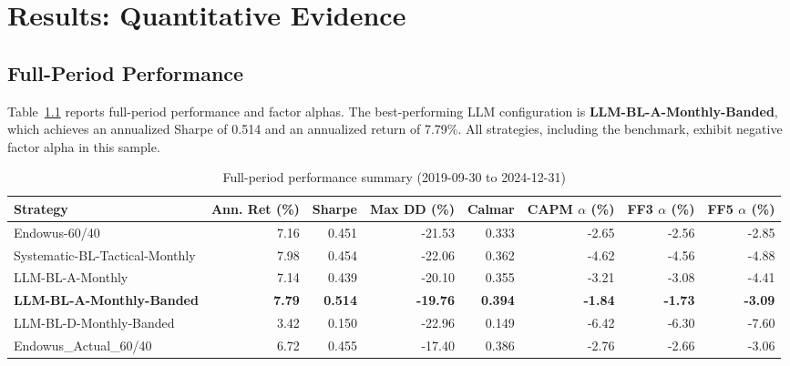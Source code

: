\documentclass[12pt]{report}
\begin{document}
\chapter{Results: Quantitative Evidence}
\section{Full-Period Performance}
Table~\ref{tab:full-period} reports full-period performance and factor alphas.
The best-performing LLM configuration is \textbf{LLM-BL-A-Monthly-Banded}, which achieves an annualized Sharpe of 0.514 and an annualized return of 7.79\%.
All strategies, including the benchmark, exhibit negative factor alpha in this sample.

\begin{table}[H]
    \centering
    \caption{Full-period performance summary (2019-09-30 to 2024-12-31)}
    \label{tab:full-period}
    \small
    \begin{tabular}{lrrrrrrr}
        \toprule
        Strategy                         & Ann. Ret (\%) & Sharpe         & Max DD (\%)     & Calmar         & CAPM $\alpha$ (\%) & FF3 $\alpha$ (\%) & FF5 $\alpha$ (\%) \\
        \midrule
        Endowus-60/40                    & 7.16          & 0.451          & -21.53          & 0.333          & -2.65              & -2.56             & -2.85             \\
        Systematic-BL-Tactical-Monthly   & 7.98          & 0.454          & -22.06          & 0.362          & -4.62              & -4.56             & -4.88             \\
        LLM-BL-A-Monthly                 & 7.14          & 0.439          & -20.10          & 0.355          & -3.21              & -3.08             & -4.41             \\
        \textbf{LLM-BL-A-Monthly-Banded} & \textbf{7.79} & \textbf{0.514} & \textbf{-19.76} & \textbf{0.394} & \textbf{-1.84}     & \textbf{-1.73}    & \textbf{-3.09}    \\
        LLM-BL-D-Monthly-Banded          & 3.42          & 0.150          & -22.96          & 0.149          & -6.42              & -6.30             & -7.60             \\
        Endowus\_Actual\_60/40           & 6.72          & 0.455          & -17.40          & 0.386          & -2.76              & -2.66             & -3.06             \\
        \bottomrule
    \end{tabular}
\end{table}
\end{document}

